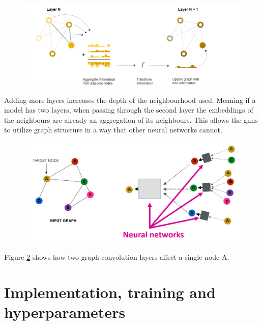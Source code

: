 \begin{figure}[H]   
    \centering
    \includegraphics[scale=0.7]{figures/messagepassing}
    \label{Message passing example}
\end{figure}

Adding more layers increases the depth of the neighbourhood used. Meaning if a model has two layers, when passing through the second layer the embeddings of the neighbours are already an aggregation of its neighbours. This allows the \gls{gnn}s to utilize graph structure in a way that other neural networks cannot.

\begin{figure}[H]
    \centering
    \includegraphics[scale=0.4]{figures/GNNExample}
    \label{GCN example}
\end{figure}

Figure \ref{GCN example} shows how two graph convolution layers affect a single node A.

\section{Implementation, training and hyperparameters}
\label{sec:implementation}


